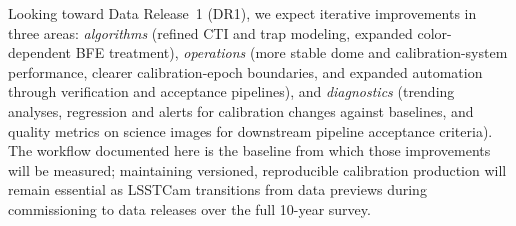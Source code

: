 Looking toward Data Release~1 (DR1), we expect iterative improvements in three areas: \emph{algorithms} (refined CTI and trap modeling, expanded color-dependent BFE treatment), \emph{operations} (more stable dome and calibration-system performance, clearer calibration-epoch boundaries, and expanded automation through verification and acceptance pipelines), and \emph{diagnostics} (trending analyses, regression and alerts for calibration changes against baselines, and quality metrics on science images for downstream pipeline acceptance criteria).
The workflow documented here is the baseline from which those improvements will be measured; maintaining versioned, reproducible calibration production will remain essential as LSSTCam transitions from data previews during commissioning to data releases over the full 10-year survey.

\vskip 0.4in
